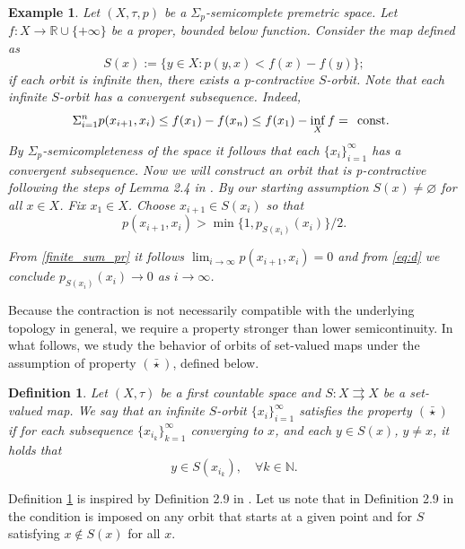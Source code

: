 \documentclass{article}
\renewcommand{\emptyset}{\varnothing}
\def\text#1{\,\;\hbox{#1}\;\,}
\newcommand{\R}{\mathbb{R}}
\newtheorem{defi}[theo]{Definition}
\newtheorem{examp}[theo]{Example}
\begin{document}
 \begin{examp} \label{Examp_Ek}   Let $(X,\tau,p)$ be a $\Sigma_p$-semicomplete premetric space. Let $f: X \rightarrow \R \cup \{+\infty\}$ be a proper, bounded below function. Consider the map defined as
$$S(x):=\{y \in X: p(y,x) < f(x)-f(y)\};$$
if each orbit is infinite then, there exists a p-contractive $S$-orbit.
Note that each infinite $S$-orbit has a convergent subsequence. Indeed,
\begin{equation}
\label{finite_sum_pr}  
\displaystyle{\Sigma_{i=1}^n p(x_{i+1},x_i) \leq f(x_1)-f(x_n) \leq f(x_1)-\inf_X f = \text{const.}}
\end{equation}
By $\Sigma_p$-semicompleteness of the space it follows that each $\{x_i\}_{i=1}^{\infty}$ has a convergent subsequence.
Now we will construct an orbit that is p-contractive following the steps of Lemma 2.4 in \cite{IKZ}. By our starting assumption $S(x) \neq \emptyset$ for all $x \in X$. Fix $x_1 \in X$. Choose $x_{i+1} \in S(x_i)$ so that \begin{equation}\label{eq:d}
            p(x_{i+1},x_i) > \min\{1, p_{S(x_i)}(x_i)\}/2.
        \end{equation}

From \ref{finite_sum_pr} it follows $\lim_{i \rightarrow \infty} p(x_{i+1},x_i)=0$ and from \ref{eq:d} we conclude $p_{S(x_i)}(x_i) \rightarrow 0$ as $i \rightarrow \infty$.
\end{examp}
Because the contraction is not necessarily compatible with the underlying topology in general, we require a property stronger than lower semicontinuity. In what follows, we study the behavior of orbits of set-valued maps under the assumption of property $(\bar{\star})$, defined below. 
\begin{defi}
    \label{def:bar_star_2}
 Let $(X, \tau)$ be a first countable space and $S:X\rightrightarrows X$ be a set-valued map. We say that an infinite $S$-orbit $\{x_i\}_{i = 1}^{\infty}$ satisfies the property $(\bar{\star})$ if for each subsequence $\{x_{i_k}\}_{k=1}^\infty$ converging to $x$, and each $y\in S(x)$, $y \neq x$, it holds that
    $$
        y \in S(x_{i_{k}}),\quad\forall k\in\mathbb{N}.
    $$
    \end{defi}
 Definition \ref{def:bar_star_2} is inspired by Definition 2.9 in \cite{IKZ}. Let us note that in Definition 2.9 in \cite{IKZ} the condition is imposed on any orbit that starts at a given point and for $S$ satisfying $x \notin S(x)$ for all $x$.
\end{document}
